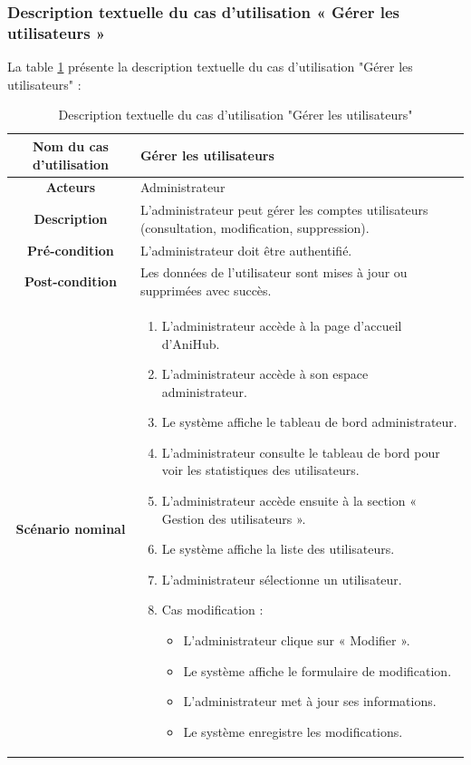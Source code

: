 \newpage 

\subsubsection{Description textuelle du cas d’utilisation « Gérer les utilisateurs »}
La table \ref{tab:gerer_utilisateurs} présente la description textuelle du cas d’utilisation "Gérer les utilisateurs" :
\begin{longtable}{|c|p{11cm}|}
\caption{Description textuelle du cas d'utilisation "Gérer les utilisateurs"}
\label{tab:gerer_utilisateurs} \\
\hline
\cellcolor{coloranihub}\textbf{Nom du cas d'utilisation } & Gérer les utilisateurs \\
\hline
\cellcolor{coloranihub}\textbf{Acteurs} & Administrateur \\
\hline
\cellcolor{coloranihub}\textbf{Description } & L’administrateur peut gérer les comptes utilisateurs (consultation, modification, suppression). \\
\hline
\cellcolor{coloranihub}\textbf{Pré-condition } & L’administrateur doit être authentifié. \\
\hline
\cellcolor{coloranihub}\textbf{Post-condition } & Les données de l’utilisateur sont mises à jour ou supprimées avec succès. \\
\hline

\cellcolor{coloranihub}\textbf{Scénario nominal } &
\begin{enumerate}
\item L’administrateur accède à la page d’accueil d’AniHub.
\item L’administrateur accède à son espace administrateur.
\item Le système affiche le tableau de bord administrateur.
\item L’administrateur consulte le tableau de bord pour voir les statistiques des utilisateurs.
\item L’administrateur accède ensuite à la section « Gestion des utilisateurs ».
\item Le système affiche la liste des utilisateurs.
\item L’administrateur sélectionne un utilisateur.

\item Cas modification :
\begin{itemize}
\item L’administrateur clique sur « Modifier ».
\item Le système affiche le formulaire de modification.
\item L’administrateur met à jour ses informations.
\item Le système enregistre les modifications.
\end{itemize}


\end{enumerate}
\end{longtable}
